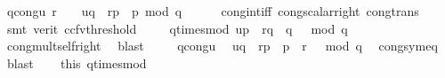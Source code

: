 \begin{isabellebody}
\ q{\isacharunderscore}{\kern0pt}cong{\isacharunderscore}{\kern0pt}u{\isacharcolon}{\kern0pt}\ {\isachardoublequoteopen}{\isacharbrackleft}{\kern0pt}{\isacharparenleft}{\kern0pt}r\ {\isacharcircum}{\kern0pt}\ {}{\isacharparenright}{\kern0pt}\ {\isacharequal}{\kern0pt}\ {\isacharquery}{\kern0pt}uq\ {\isacharasterisk}{\kern0pt}\ r{\isacharunderscore}{\kern0pt}p\ {\isacharasterisk}{\kern0pt}\ p{\isacharbrackright}{\kern0pt}\ {\isacharparenleft}{\kern0pt}mod\ q{\isacharparenright}{\kern0pt}{\isachardoublequoteclose}\isanewline
\ \ \ \ \isamarkupfalse%
\ cong{\isacharunderscore}{\kern0pt}int{\isacharunderscore}{\kern0pt}iff\ cong{\isacharunderscore}{\kern0pt}scalar{\isacharunderscore}{\kern0pt}right\ cong{\isacharunderscore}{\kern0pt}trans\isanewline
\ \ \ \ \isamarkupfalse%
\ {\isacharparenleft}{\kern0pt}smt\ {\isacharparenleft}{\kern0pt}verit{\isacharcomma}{\kern0pt}\ ccfv{\isacharunderscore}{\kern0pt}threshold{\isacharparenright}{\kern0pt}\ {\isacharparenright}{\kern0pt}\isanewline
\isanewline
\isanewline
\ \ \isamarkupfalse%
\ q{\isacharunderscore}{\kern0pt}times{\isacharunderscore}{\kern0pt}mod{\isacharunderscore}{\kern0pt}{}{\isacharcolon}{\kern0pt}\ {\isachardoublequoteopen}{\isacharbrackleft}{\kern0pt}{\isacharquery}{\kern0pt}up\ {\isacharasterisk}{\kern0pt}\ r{\isacharunderscore}{\kern0pt}q\ {\isacharasterisk}{\kern0pt}\ q\ {\isacharequal}{\kern0pt}\ {}{\isacharbrackright}{\kern0pt}\ {\isacharparenleft}{\kern0pt}mod\ q{\isacharparenright}{\kern0pt}{\isachardoublequoteclose}\isanewline
\ \ \ \ \isamarkupfalse%
\ cong{\isacharunderscore}{\kern0pt}mult{\isacharunderscore}{\kern0pt}self{\isacharunderscore}{\kern0pt}right\ \isamarkupfalse%
\ blast\ \isanewline
\ \ \isamarkupfalse%
\ q{\isacharunderscore}{\kern0pt}cong{\isacharunderscore}{\kern0pt}u\ \isamarkupfalse%
\ {\isachardoublequoteopen}{\isacharbrackleft}{\kern0pt}{\isacharquery}{\kern0pt}uq\ {\isacharasterisk}{\kern0pt}\ r{\isacharunderscore}{\kern0pt}p\ {\isacharasterisk}{\kern0pt}\ p\ {\isacharequal}{\kern0pt}\ {\isacharparenleft}{\kern0pt}r\ {\isacharcircum}{\kern0pt}\ {}{\isacharparenright}{\kern0pt}{\isacharbrackright}{\kern0pt}\ {\isacharparenleft}{\kern0pt}mod\ q{\isacharparenright}{\kern0pt}{\isachardoublequoteclose}\ \isamarkupfalse%
\ cong{\isacharunderscore}{\kern0pt}sym{\isacharunderscore}{\kern0pt}eq\ \isamarkupfalse%
\ blast\isanewline
\ \ \isamarkupfalse%
\ this\ q{\isacharunderscore}{\kern0pt}times{\isacharunderscore}{\kern0pt}mod{\isacharunderscore}{\kern0pt}{}\ \isamarkupfalse%

\end{isabellebody}
